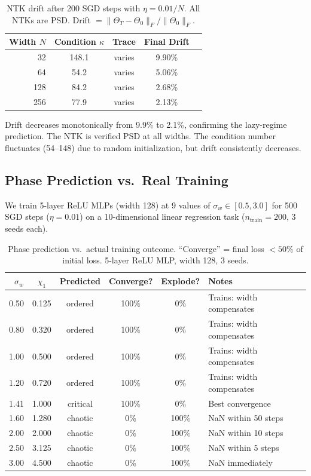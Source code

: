 \documentclass[10pt]{article}
\theoremstyle{definition}
\begin{document}
\begin{table}[t]
\centering
\caption{NTK drift after 200 SGD steps with $\eta = 0.01/N$. All NTKs are PSD. Drift $= \|\Theta_T - \Theta_0\|_F / \|\Theta_0\|_F$.}
\label{tab:ntk-drift}
\begin{tabular}{rcccc}
\toprule
Width $N$ & Condition $\kappa$ & Trace & Final Drift \\
\midrule
32  & 148.1 & varies & 9.90\% \\
64  & 54.2  & varies & 5.06\% \\
128 & 84.2  & varies & 2.68\% \\
256 & 77.9  & varies & 2.13\% \\
\bottomrule
\end{tabular}
\end{table}

Drift decreases monotonically from 9.9\% to 2.1\%, confirming the lazy-regime prediction.
The NTK is verified PSD at all widths.
The condition number fluctuates (54--148) due to random initialization, but drift consistently decreases.

\subsection{Phase Prediction vs.\ Real Training}
\label{sec:phase-validation}

We train 5-layer ReLU MLPs (width 128) at 9 values of $\sigma_w \in [0.5, 3.0]$ for 500 SGD steps ($\eta = 0.01$) on a 10-dimensional linear regression task ($n_{\text{train}} = 200$, 3 seeds each).

\begin{table}[t]
\centering
\caption{Phase prediction vs.\ actual training outcome. ``Converge'' = final loss $< 50\%$ of initial loss. 5-layer ReLU MLP, width 128, 3 seeds.}
\label{tab:phase-validation}
\begin{tabular}{rccccl}
\toprule
$\sigma_w$ & $\chi_1$ & Predicted & Converge? & Explode? & Notes \\
\midrule
0.50 & 0.125 & ordered & 100\% & 0\% & Trains: width compensates \\
0.80 & 0.320 & ordered & 100\% & 0\% & Trains: width compensates \\
1.00 & 0.500 & ordered & 100\% & 0\% & Trains: width compensates \\
1.20 & 0.720 & ordered & 100\% & 0\% & Trains: width compensates \\
1.41 & 1.000 & critical & 100\% & 0\% & Best convergence \\
1.60 & 1.280 & chaotic & 0\% & 100\% & NaN within 50 steps \\
2.00 & 2.000 & chaotic & 0\% & 100\% & NaN within 10 steps \\
2.50 & 3.125 & chaotic & 0\% & 100\% & NaN within 5 steps \\
3.00 & 4.500 & chaotic & 0\% & 100\% & NaN immediately \\
\bottomrule
\end{tabular}
\end{table}
\end{document}
